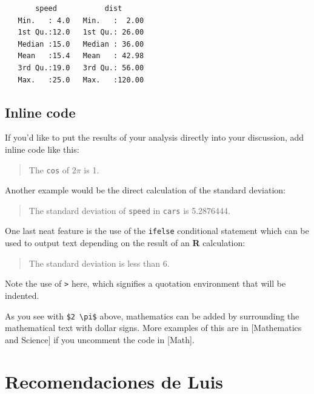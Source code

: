 \documentclass[12pt,twoside]{reedthesis}
\begin{document}
  \begin{Shaded}
  \begin{Highlighting}[]
  \end{Highlighting}
  \end{Shaded}
  
  \begin{verbatim}
       speed           dist       
   Min.   : 4.0   Min.   :  2.00  
   1st Qu.:12.0   1st Qu.: 26.00  
   Median :15.0   Median : 36.00  
   Mean   :15.4   Mean   : 42.98  
   3rd Qu.:19.0   3rd Qu.: 56.00  
   Max.   :25.0   Max.   :120.00  
  \end{verbatim}
  
  \subsection{Inline code}\label{inline-code}
  
  If you'd like to put the results of your analysis directly into your
  discussion, add inline code like this:
  
  \begin{quote}
  The \texttt{cos} of \(2 \pi\) is 1.
  \end{quote}
  
  Another example would be the direct calculation of the standard
  deviation:
  
  \begin{quote}
  The standard deviation of \texttt{speed} in \texttt{cars} is 5.2876444.
  \end{quote}
  
  One last neat feature is the use of the \texttt{ifelse} conditional
  statement which can be used to output text depending on the result of an
  \textbf{R} calculation:
  
  \begin{quote}
  The standard deviation is less than 6.
  \end{quote}
  
  Note the use of \texttt{\textgreater{}} here, which signifies a
  quotation environment that will be indented.
  
  As you see with \texttt{\$2\ \textbackslash{}pi\$} above, mathematics
  can be added by surrounding the mathematical text with dollar signs.
  More examples of this are in {[}Mathematics and Science{]} if you
  uncomment the code in {[}Math{]}.
  
  \section{Recomendaciones de Luis}\label{recomendaciones-de-luis}
  
\end{document}
